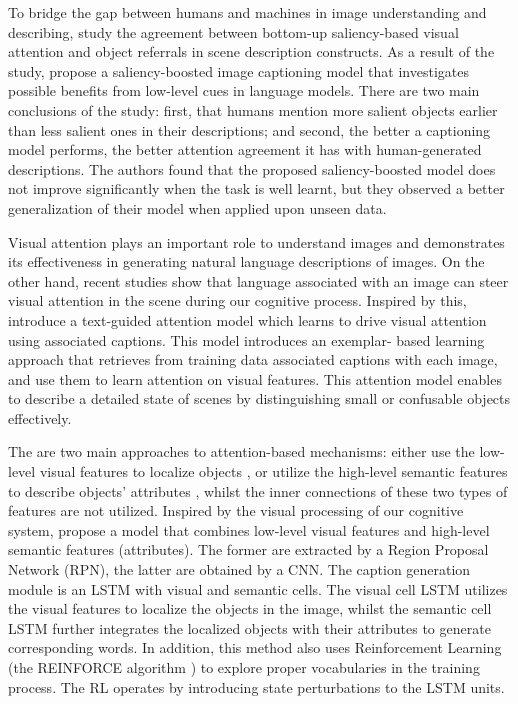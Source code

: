 To bridge the gap between humans and machines in image understanding and describing, \citet{Tavakoliy2017} study the agreement between bottom-up saliency-based visual attention and object referrals in scene description constructs. As a result of the study, \citeauthor{Tavakoliy2017} propose a saliency-boosted image captioning model that investigates possible benefits from low-level cues in language models. There are two main conclusions of the study: first, that humans mention more salient objects earlier than less salient ones in their descriptions; and second, the better a captioning model performs, the better attention agreement it has with human-generated descriptions. The authors found that the proposed saliency-boosted model does not improve significantly when the task is well learnt, but they observed a better generalization of their model when applied upon unseen data.

Visual attention plays an important role to understand images and demonstrates its effectiveness in generating natural language descriptions of images. On the other hand, recent studies show that language associated with an image can steer visual attention in the scene during our cognitive process. Inspired by this, \citet{Mun2017} introduce a text-guided attention model which learns to drive visual attention using associated captions. This model introduces an exemplar- based learning approach that retrieves from training data associated captions with each image, and use them to learn attention on visual features. This attention model enables to describe a detailed state of scenes by distinguishing small or confusable objects effectively. 

The are two main approaches to attention-based mechanisms: either use the low-level visual features to localize objects \citep{Xu2015, Lu2017}, or utilize the high-level semantic features to describe objects’ attributes \citep{Wang2017, Wu2016}, whilst the inner connections of these two types of features are not utilized. Inspired by the visual
processing of our cognitive system, \citet{Li2018_VS-LSTM} propose a model that combines low-level visual features and high-level semantic features  (attributes). The former are extracted by a Region Proposal Network (RPN), the latter are obtained by a CNN. The caption generation module is an LSTM with visual and semantic cells. The visual cell LSTM utilizes the visual features to localize the objects in the image, whilst the semantic cell LSTM further integrates the localized objects with their attributes to generate corresponding words. In addition, this method also uses Reinforcement Learning (the REINFORCE algorithm \citep{Sutton1999}) to explore proper vocabularies in the training process. The RL operates by introducing state perturbations to the LSTM units.

